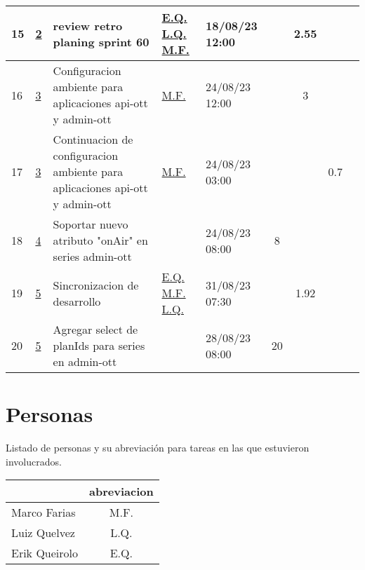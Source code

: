 \documentclass{article}
\begin{document}
\begin{longtable}{|m{0.5cm}|m{1.2cm}|p{5cm}|m{1.5cm}|m{1.5cm}||c|c|c|c||}
                 \label{15}15  &  \hyperref[2]{\color{blue}2}  & review retro planing sprint 60 &  
                  \hyperref[E.Q.]{\color{blue}E.Q.} \newline  \hyperref[L.Q.]{\color{blue}L.Q.} \newline  \hyperref[M.F.]{\color{blue}M.F.}  & 18/08/23 12:00  &  & 2.55 &  & \\ \hline 

                 \label{16}16  &  \hyperref[3]{\color{blue}3}  & Configuracion ambiente para aplicaciones api-ott y admin-ott &  
                  \hyperref[M.F.]{\color{blue}M.F.}  & 24/08/23 12:00  &  & 3 &  & \\ \hline 

                 \label{17}17  &  \hyperref[3]{\color{blue}3}  & Continuacion de configuracion ambiente para aplicaciones api-ott y admin-ott &  
                  \hyperref[M.F.]{\color{blue}M.F.}  & 24/08/23 03:00  &  &  & 0.7 & \\ \hline 

                 \label{18}18  &  \hyperref[4]{\color{blue}4}  & Soportar nuevo atributo "onAir" en series admin-ott &  
                 & 24/08/23 08:00  & 8 &  &  & \\ \hline 

                 \label{19}19  &  \hyperref[5]{\color{blue}5}  & 
Sincronizacion de desarrollo &  
                  \hyperref[E.Q.]{\color{blue}E.Q.} \newline  \hyperref[M.F.]{\color{blue}M.F.} \newline  \hyperref[L.Q.]{\color{blue}L.Q.}  & 31/08/23 07:30  &  & 1.92 &  & \\ \hline 

                 \label{20}20  &  \hyperref[5]{\color{blue}5}  & Agregar select de planIds para series en admin-ott &  
                 & 28/08/23 08:00  & 20 &  &  & \\ \hline 

    \end{longtable} 
 \newpage
\section{Personas}
Listado de personas y su abreviación para tareas en las que estuvieron involucrados.
\begin{table}[htbp]
    \centering
    \begin{tabular}{|p{6cm}|c|}
        \hline
        \centering{\textbf{Nombre}} & \textbf{abreviacion} \\ \hline
        Marco Farias &  \label{M.F.}M.F.  \\ \hline
        Luiz Quelvez &  \label{L.Q.}L.Q.  \\ \hline
        Erik Queirolo &  \label{E.Q.}E.Q.  \\ \hline
    \end{tabular}
\end{table} 
 
\end{document}
